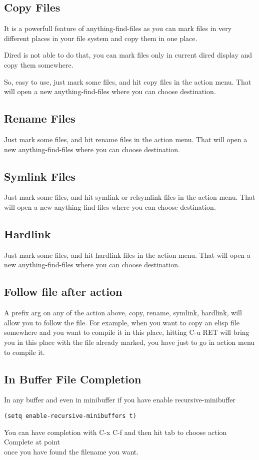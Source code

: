 \documentclass[a4paper,11pt]{article}
\begin{document}
\subsection{Copy Files}
\label{sec:copy-files}
It is a powerfull feature of anything-find-files as you can mark files in very different places in your
file system and copy them in one place.

Dired is not able to do that, you can mark files only in current dired display and copy them somewhere.

So, easy to use, just mark some files, and hit copy files in the action menu.
That will open a new anything-find-files where you can choose destination.
\subsection{Rename Files}
\label{sec:rename-files}
Just mark some files, and hit rename files in the action menu.
That will open a new anything-find-files where you can choose destination.
\subsection{Symlink Files}
\label{sec:symlink-files}
Just mark some files, and hit symlink or relsymlink files in the action menu.
That will open a new anything-find-files where you can choose destination.
\subsection{Hardlink}
\label{sec:hardlink}
Just mark some files, and hit hardlink files in the action menu.
That will open a new anything-find-files where you can choose destination.

\subsection{Follow file after action}
\label{sec:follow-file-after}
A prefix arg on any of the action above, copy, rename, symlink, hardlink, will
allow you to follow the file.
For example, when you want to copy an elisp file somewhere and you want to compile it in this place,
hitting C-u RET will bring you in this place with the file already marked, you have just to go in action menu to
compile it.  

\subsection{In Buffer File Completion}
\label{sec:buff-file-compl}
In any buffer and even in minibuffer if you have enable recursive-minibuffer
\begin{verbatim}
(setq enable-recursive-minibuffers t)
\end{verbatim}
You can have completion with C-x C-f and then hit tab to choose action Complete at point \\ 
once you have found the filename you want.
\end{document}
